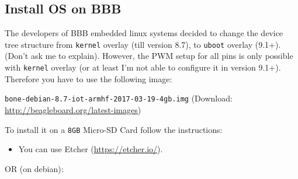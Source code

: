 \documentclass[
	fontsize=10pt
	paper=a4
]{scrartcl}
\begin{document}
\subsection{Install OS on BBB}

The developers of BBB embedded linux systems decided to change the device tree structure from \texttt{kernel} overlay (till version 8.7), to \texttt{uboot} overlay (9.1+). (Don't ask me to explain).
However, the PWM setup for all pins is only possible with \texttt{kernel} overlay (or at least I'm not able to configure it in version 9.1+).
Therefore you have to use the following image:

\texttt{bone-debian-8.7-iot-armhf-2017-03-19-4gb.img}
(Download: \url{http://beagleboard.org/latest-images})

To install it on a \texttt{8GB} Micro-SD Card follow the instructions:

\begin{itemize}
\item You can use Etcher (\url{https://etcher.io/}).
\end{itemize}

OR (on debian):
\end{document}
